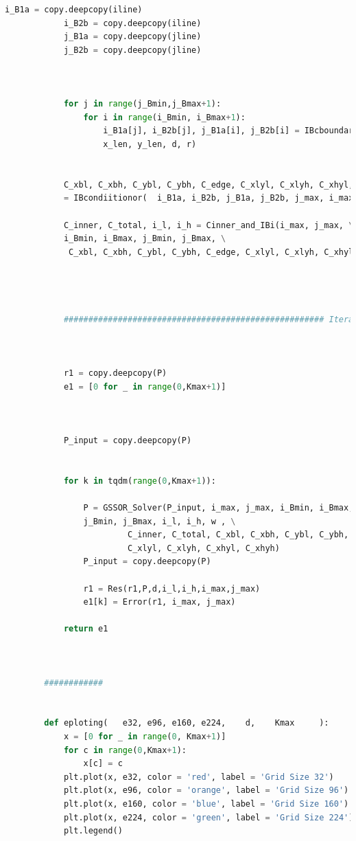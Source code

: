 \documentclass[12pt]{article}
\begin{document}
\begin{scriptsize}
\begin{lstlisting}[language=python,caption={Python code-Functions for Iteration Solver and Result Analysist}]
            i_B1a = copy.deepcopy(iline)
            i_B2b = copy.deepcopy(iline)
            j_B1a = copy.deepcopy(jline)
            j_B2b = copy.deepcopy(jline)
        
        
        
            for j in range(j_Bmin,j_Bmax+1):
                for i in range(i_Bmin, i_Bmax+1):
                    i_B1a[j], i_B2b[j], j_B1a[i], j_B2b[i] = IBcboundary(i, j ,  \
                    x_len, y_len, d, r)
        
        
            C_xbl, C_xbh, C_ybl, C_ybh, C_edge, C_xlyl, C_xlyh, C_xhyl, C_xhyh \
            = IBcondiitionor(  i_B1a, i_B2b, j_B1a, j_B2b, j_max, i_max)
        
            C_inner, C_total, i_l, i_h = Cinner_and_IBi(i_max, j_max, \
            i_Bmin, i_Bmax, j_Bmin, j_Bmax, \
             C_xbl, C_xbh, C_ybl, C_ybh, C_edge, C_xlyl, C_xlyh, C_xhyl, C_xhyh)     
        
        
        
        
            ##################################################### Iteration Part ###################################################################################
        
        
        
            r1 = copy.deepcopy(P)
            e1 = [0 for _ in range(0,Kmax+1)]
        
        
        
            P_input = copy.deepcopy(P)
            
        
            for k in tqdm(range(0,Kmax+1)):
        
                P = GSSOR_Solver(P_input, i_max, j_max, i_Bmin, i_Bmax, \
                j_Bmin, j_Bmax, i_l, i_h, w , \
                         C_inner, C_total, C_xbl, C_xbh, C_ybl, C_ybh, C_edge, \
                         C_xlyl, C_xlyh, C_xhyl, C_xhyh)
                P_input = copy.deepcopy(P)
        
                r1 = Res(r1,P,d,i_l,i_h,i_max,j_max)
                e1[k] = Error(r1, i_max, j_max)
        
            return e1
                
        
        
        ############
        
        
        def eploting(   e32, e96, e160, e224,    d,    Kmax     ):
            x = [0 for _ in range(0, Kmax+1)]
            for c in range(0,Kmax+1):
                x[c] = c
            plt.plot(x, e32, color = 'red', label = 'Grid Size 32')
            plt.plot(x, e96, color = 'orange', label = 'Grid Size 96')
            plt.plot(x, e160, color = 'blue', label = 'Grid Size 160')
            plt.plot(x, e224, color = 'green', label = 'Grid Size 224')
            plt.legend()
        

\end{lstlisting}
\end{scriptsize}
\end{document}

